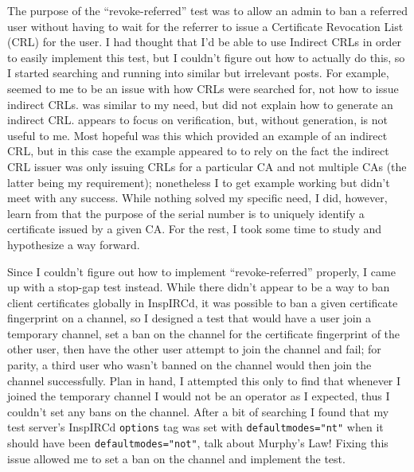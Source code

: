 \documentclass{article}
\begin{document}
The purpose of the ``revoke-referred'' test was to allow an admin to ban a referred user without having to wait for the referrer to issue a Certificate Revocation List (CRL) for the user.  I had thought that I'd be able to use Indirect CRLs in order to easily implement this test, but I couldn't figure out how to actually do this, so I started searching and running into similar but irrelevant posts.  For example,  seemed to me to be an issue with how CRLs were searched for, not how to issue indirect CRLs.   was similar to my need, but did not explain how to generate an indirect CRL.   appears to focus on verification, but, without generation, is not useful to me.  Most hopeful was this  which provided an example of an indirect CRL, but in this case the example appeared to to rely on the fact the indirect CRL issuer was only issuing CRLs for a particular CA and not multiple CAs (the latter being my requirement); nonetheless I  to get example working but didn't meet with any success.  While nothing solved my specific need, I did, however, learn from  that the purpose of the serial number is to uniquely identify a certificate issued by a given CA.  For the rest, I took some time to study  and hypothesize a way forward.

Since I couldn't figure out how to implement ``revoke-referred'' properly, I came up with a stop-gap test instead.  While there didn't appear to be a way to ban client certificates globally in InspIRCd, it was possible to ban a given certificate fingerprint on a channel, so I designed a test that would have a user join a temporary channel, set a ban on the channel for the certificate fingerprint of the other user, then have the other user attempt to join the channel and fail; for parity, a third user who wasn't banned on the channel would then join the channel successfully.  Plan in hand, I attempted this only to find that whenever I joined the temporary channel I would not be an operator as I expected, thus I couldn't set any bans on the channel.  After a bit of searching I found that my test server's InspIRCd \texttt{options} tag was set with \texttt{defaultmodes="nt"} when it should have been \texttt{defaultmodes="not"}, talk about Murphy's Law!  Fixing this issue allowed me to set a ban on the channel and implement the test.
\end{document}
